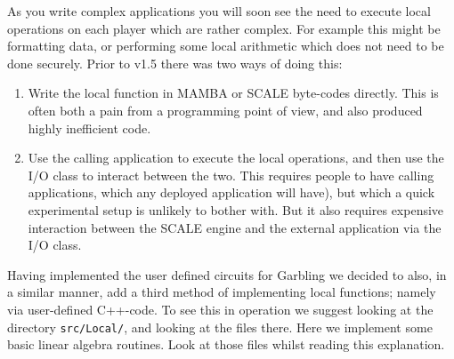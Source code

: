 \label{sec:Local}
As you write complex applications you will soon see the
need to execute local operations on each player which are
rather complex. For example this might be formatting data,
or performing some local arithmetic which does not need
to be done securely. 
Prior to v1.5 there was two ways of doing this:
\begin{enumerate}
\item Write the local function in MAMBA or SCALE byte-codes
directly. This is often both a pain from a programming point
of view, and also produced highly inefficient code.
\item Use the calling application to execute the local
operations, and then use the I/O class to interact
between the two. This requires people to have calling
applications, which any deployed application will have),
but which a quick experimental setup is unlikely to
bother with.
But it also requires expensive interaction between the
SCALE engine and the external application via the I/O
class.
\end{enumerate}
Having implemented the user defined circuits for Garbling
we decided to also, in a similar manner, add a third method
of implementing local functions; namely via user-defined
C++-code.
To see this in operation we suggest looking at the directory
\verb|src/Local/|, and looking at the files there. Here
we implement some basic linear algebra routines.
Look at those files whilst reading this explanation.

